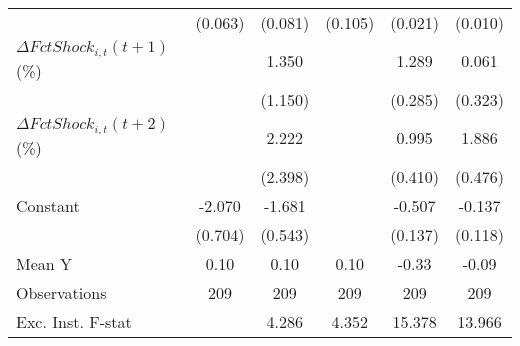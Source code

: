 {\begin{tabular}{l*{5}{c}}
                    &     (0.063)         &     (0.081)         &     (0.105)         &     (0.021)         &     (0.010)         \\
\addlinespace
$ \Delta FctShock_{i,t}(t+1)$ (\%)&                     &       1.350         &                     &       1.289\sym{***}&       0.061         \\
                    &                     &     (1.150)         &                     &     (0.285)         &     (0.323)         \\
\addlinespace
$ \Delta FctShock_{i,t}(t+2)$ (\%)&                     &       2.222         &                     &       0.995\sym{**} &       1.886\sym{***}\\
                    &                     &     (2.398)         &                     &     (0.410)         &     (0.476)         \\
\addlinespace
Constant            &      -2.070\sym{**} &      -1.681\sym{**} &                     &      -0.507\sym{***}&      -0.137         \\
                    &     (0.704)         &     (0.543)         &                     &     (0.137)         &     (0.118)         \\
\midrule
Mean Y              &        0.10         &        0.10         &        0.10         &       -0.33         &       -0.09         \\
Observations        &         209         &         209         &         209         &         209         &         209         \\
Exc. Inst. F-stat   &                     &       4.286         &       4.352         &      15.378         &      13.966         \\
\bottomrule
\end{tabular}
}
